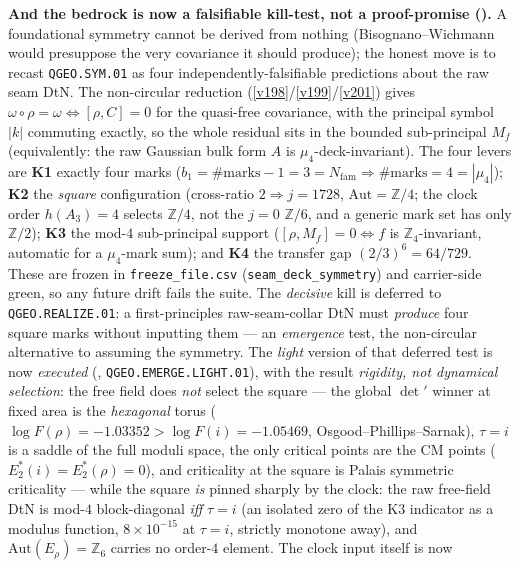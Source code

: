 \documentclass[11pt,a4paper]{article}
\newcommand{\Z}{\mathbb Z}
\begin{document}
\begin{keybox}
\begin{keybox}
\end{keybox}
\par\smallskip\noindent\textbf{And the bedrock is now a falsifiable kill-test, not a proof-promise
().} A foundational symmetry cannot be derived from nothing
(Bisognano--Wichmann would presuppose the very covariance it should produce); the honest move is to recast
\texttt{QGEO.SYM.01} as four independently-falsifiable predictions about the raw seam DtN. The non-circular
reduction (\vref{v198}/\vref{v199}/\vref{v201}) gives $\omega{\circ}\rho{=}\omega\Leftrightarrow[\rho,C]{=}0$
for the quasi-free covariance, with the principal symbol $|k|$ commuting exactly, so the whole residual sits
in the bounded sub-principal $M_f$ (equivalently: the raw Gaussian bulk form $A$ is $\mu_4$-deck-invariant).
The four levers are \textbf{K1} exactly four marks ($b_1{=}\#\text{marks}{-}1{=}3{=}N_{\mathrm{fam}}\Rightarrow
\#\text{marks}{=}4{=}|\mu_4|$); \textbf{K2} the \emph{square} configuration (cross-ratio $2\Rightarrow
j{=}1728$, $\mathrm{Aut}{=}\Z/4$; the clock order $h(A_3){=}4$ selects $\Z/4$, not the $j{=}0$ $\Z/6$, and a
generic mark set has only $\Z/2$); \textbf{K3} the mod-$4$ sub-principal support ($[\rho,M_f]{=}0\Leftrightarrow
f$ is $\Z_4$-invariant, automatic for a $\mu_4$-mark sum); and \textbf{K4} the transfer gap $(2/3)^6{=}64/729$.
These are frozen in \texttt{freeze\_file.csv} (\texttt{seam\_deck\_symmetry}) and carrier-side green, so any
future drift fails the suite. The \emph{decisive} kill is deferred to \texttt{QGEO.REALIZE.01}: a
first-principles raw-seam-collar DtN must \emph{produce} four square marks without inputting them --- an
\emph{emergence} test, the non-circular alternative to assuming the symmetry. The \emph{light} version of
that deferred test is now \emph{executed} (,
\texttt{QGEO.EMERGE.LIGHT.01}), with the result \emph{rigidity, not dynamical selection}: the free field
does \emph{not} select the square --- the global $\det{}'$ winner at fixed area is the \emph{hexagonal}
torus ($\log F(\rho)=-1.03352>\log F(i)=-1.05469$, Osgood--Phillips--Sarnak), $\tau=i$ is a saddle of the
full moduli space, the only critical points are the CM points ($E_2^*(i)=E_2^*(\rho)=0$), and criticality
at the square is Palais symmetric criticality --- while the square \emph{is} pinned sharply by the clock:
the raw free-field DtN is mod-$4$ block-diagonal \emph{iff} $\tau=i$ (an isolated zero of the K3
indicator as a modulus function, $8\times10^{-15}$ at $\tau=i$, strictly monotone away), and
$\mathrm{Aut}(E_\rho)=\Z_6$ carries no order-$4$ element. The clock input itself is now

\end{keybox}
\end{document}
